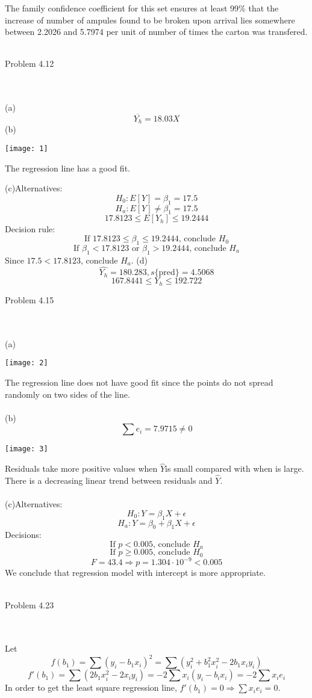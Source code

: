\documentclass{article}
\begin{document}
The family confidence coefficient for this set ensures at least 99\% that the increase of number of ampules found to be broken upon arrival lies somewhere between 2.2026 and 5.7974 per unit of number of times the carton was transfered.
\\\\\begin{large}Problem 4.12\end{large}
\\\\(a)\[\overline{Y_h}=18.03X\]
(b)\begin{center}
   \texttt{[image: 1]}
   \begin{center}The regression line has a good fit.\end{center}\end{center}
   (c)Alternatives:\[H_0:E[Y]=\beta_{1}=17.5\]
   \[H_a:E[Y]\neq\beta_{1}=17.5\]
   \[17.8123\leq E[Y_h]\leq19.2444\]
   Decision rule: \[\text{If $17.8123\leq\beta_{1}\leq19.2444$, conclude $H_0$}\]
   \[\text{If $\beta_{1}<17.8123$ or $\beta_{1}>19.2444$, conclude $H_a$}\]
   Since $17.5<17.8123$, conclude $H_a$.
   (d)\[\hat{Y_h}=180.283,s\{\text{pred}\}=4.5068\]
   \[167.8441\leq Y_h\leq192.722\]
\begin{large}Problem 4.15\end{large}
\\\\(a)\begin{center}
   \texttt{[image: 2]}
   \end{center}
The regression line does not have good fit since the points do not spread randomly on two sides of the line.
\\\\(b)\[\sum{e_i}=7.9715\neq0\]
\begin{center}
   \texttt{[image: 3]}
   \end{center}
Residuals take more positive values when $\hat{Y}$is small compared with when 
is large. There is a decreasing linear trend between residuals and $\hat{Y}$.
\\\\(c)Alternatives:\[H_0:Y=\beta_1X+\epsilon\]
\[H_a:Y=\beta_0+\beta_1X+\epsilon\]
Decisions: \[\text{If $p<0.005$, conclude $H_a$}\]
\[\text{If $p\geq0.005$, conclude $H_0$}\]
\[F=43.4\Rightarrow p=1.304\cdot10^{-9}<0.005\]
We conclude that regression model with intercept is more appropriate.
\\\\\begin{large}Problem 4.23\end{large}
\\\\Let\[f(b_1)=\sum(y_i-b_1x_i)^2=\sum(y^2_i+b^2_1x^2_i-2b_1x_iy_i)\]
\[f'(b_1)=\sum(2b_1x_i^2-2x_iy_i)=-2\sum x_i(y_i-b_ix_i)=-2\sum x_ie_i\]
In order to get the least square regression line, $f'(b_1)=0\Rightarrow\sum x_ie_i=0$.
\end{document}
